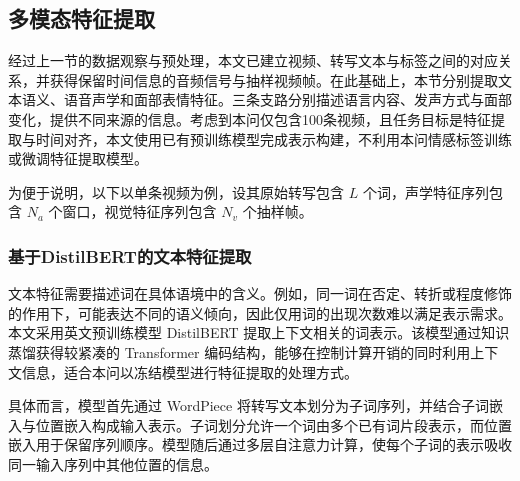 


\subsection{多模态特征提取} 

经过上一节的数据观察与预处理，本文已建立视频、转写文本与标签之间的对应关系，并获得保留时间信息的音频信号与抽样视频帧。在此基础上，本节分别提取文本语义、语音声学和面部表情特征。三条支路分别描述语言内容、发声方式与面部变化，提供不同来源的信息。考虑到本问仅包含100条视频，且任务目标是特征提取与时间对齐，本文使用已有预训练模型完成表示构建，不利用本问情感标签训练或微调特征提取模型。

为便于说明，以下以单条视频为例，设其原始转写包含 $L$ 个词，声学特征序列包含 $N_a$ 个窗口，视觉特征序列包含 $N_v$ 个抽样帧。


\subsubsection{基于DistilBERT的文本特征提取}

文本特征需要描述词在具体语境中的含义。例如，同一词在否定、转折或程度修饰的作用下，可能表达不同的语义倾向，因此仅用词的出现次数难以满足表示需求。本文采用英文预训练模型 DistilBERT 提取上下文相关的词表示。该模型通过知识蒸馏获得较紧凑的 Transformer 编码结构，能够在控制计算开销的同时利用上下文信息，适合本问以冻结模型进行特征提取的处理方式。

具体而言，模型首先通过 WordPiece 将转写文本划分为子词序列，并结合子词嵌入与位置嵌入构成输入表示。子词划分允许一个词由多个已有词片段表示，而位置嵌入用于保留序列顺序。模型随后通过多层自注意力计算，使每个子词的表示吸收同一输入序列中其他位置的信息。


